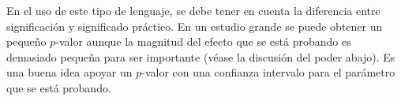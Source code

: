 \documentclass[]{article}
\numberwithin{equation}{section}
\begin{document}
En el uso de este tipo de lenguaje, se debe tener en cuenta la
diferencia entre significación y significado práctico. En un estudio
grande se puede obtener un pequeño \(p\)-valor aunque la magnitud del
efecto que se está probando es demasiado pequeña para ser importante
(véase la discusión del poder abajo). Es una buena idea apoyar un
\(p\)-valor con una confianza intervalo para el parámetro que se está
probando.
\end{document}
